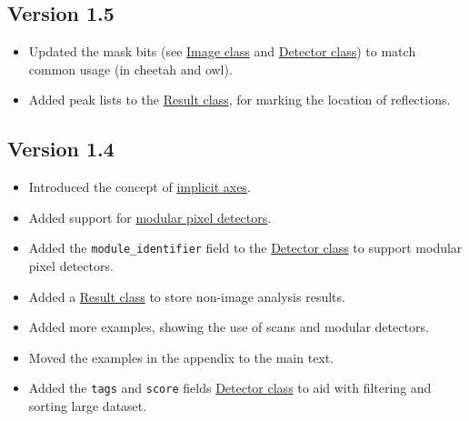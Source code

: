 \documentclass[usletter,11pt]{article}
\begin{document}
\subsection{Version 1.5}
\begin{itemize}
\item{Updated the mask bits (see \hyperref[table:image]{Image
    class} and \hyperref[table:detector]{Detector class}) to match common usage
  (in cheetah and owl). }
\item{Added peak lists to the \hyperref[table:result]{Result
    class}, for marking the location of reflections.}
\end{itemize}

\subsection{Version 1.4}
\begin{itemize}
\item{Introduced the concept of \hyperref[sec:scans]{implicit axes}. }
\item{Added support for \hyperref[subsec:modularDetectors]{modular pixel
    detectors}.}
\item{Added the {\tt module\_identifier} field to the
  \hyperref[table:detector]{Detector class} to support modular pixel detectors.}
\item{Added a \hyperref[table:result]{Result class} to store non-image analysis
  results.}
\item{Added more examples, showing the use of scans and modular detectors.}
\item{Moved the examples in the appendix to the main text.}
\item{Added the {\tt tags} and {\tt score} fields \hyperref[table:detector]{Detector class} 
  to aid with filtering and sorting large dataset.}
\end{itemize}
\end{document}
